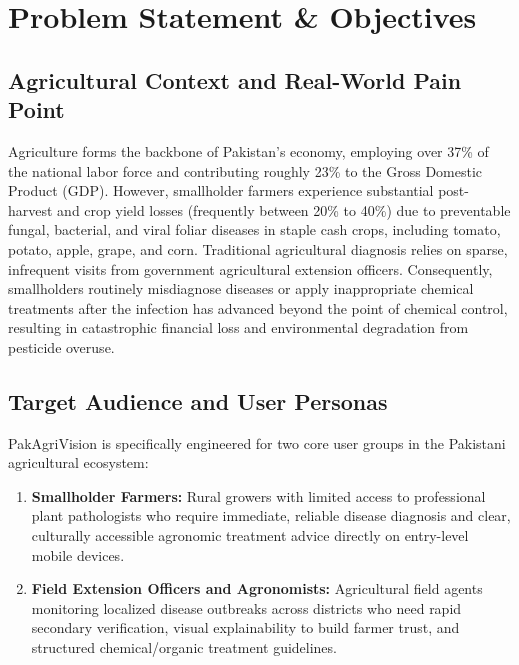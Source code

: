 \section{Problem Statement \& Objectives}
\label{sec:problem}

\subsection{Agricultural Context and Real-World Pain Point}
Agriculture forms the backbone of Pakistan's economy, employing over 37\% of the national labor force and contributing roughly 23\% to the Gross Domestic Product (GDP). However, smallholder farmers experience substantial post-harvest and crop yield losses (frequently between 20\% to 40\%) due to preventable fungal, bacterial, and viral foliar diseases in staple cash crops, including tomato, potato, apple, grape, and corn. Traditional agricultural diagnosis relies on sparse, infrequent visits from government agricultural extension officers. Consequently, smallholders routinely misdiagnose diseases or apply inappropriate chemical treatments after the infection has advanced beyond the point of chemical control, resulting in catastrophic financial loss and environmental degradation from pesticide overuse.

\subsection{Target Audience and User Personas}
PakAgriVision is specifically engineered for two core user groups in the Pakistani agricultural ecosystem:
\begin{enumerate}
    \item \textbf{Smallholder Farmers:} Rural growers with limited access to professional plant pathologists who require immediate, reliable disease diagnosis and clear, culturally accessible agronomic treatment advice directly on entry-level mobile devices.
    \item \textbf{Field Extension Officers and Agronomists:} Agricultural field agents monitoring localized disease outbreaks across districts who need rapid secondary verification, visual explainability to build farmer trust, and structured chemical/organic treatment guidelines.
\end{enumerate}

